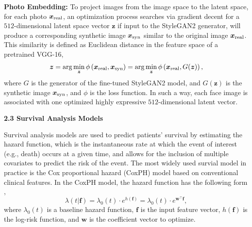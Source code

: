 \documentclass[runningheads]{llncs}
\newcommand{\xreal}{\boldsymbol{x}\textsubscript{real}}
\newcommand{\xfake}{\boldsymbol{x}\textsubscript{syn}}
\newcommand{\vz}{\boldsymbol{z}}
\newcommand{\vf}{\boldsymbol{f}}
\newcommand{\vw}{\boldsymbol{w}}
\begin{document}

\noindent\textbf{Photo Embedding:} To project images from the image space to
the latent space, for each photo $\xreal$, an optimization process searches via gradient decent for a $512$-dimensional latent space vector $\vz$ if input to the StyleGAN2 generator, will produce a corresponding synthetic image $\xfake$ similar to the original image $\xreal$. This similarity is defined as Euclidean distance in the feature space of a pretrained VGG-16,
\begin{equation}
\vz = \arg \min_{\vz} \phi\left(\xreal, \xfake \right) = \arg \min_{\vz} \phi\left(\xreal, G(\vz) \right) ,
\end{equation}
where $G$ is the generator of the fine-tuned StyleGAN2 model, and $G(\vz)$ is the synthetic image $\xfake$, and $\phi$ is the loss function. 
In such a way, each face image is associated with one optimized highly expressive $512$-dimensional latent vector.

\vspace{5pt}
\noindent\textbf{2.3 Survival Analysis Models}
\vspace{5pt}

Survival analysis models are used to predict patients' survival by estimating the hazard function, which is the instantaneous rate at which the event of interest (e.g., death) occurs at a given time, and allows for the inclusion of multiple covariates to predict the risk of the event. 
The most widely used survial model in practice is the Cox proportional hazard (CoxPH) \cite{lin2002modeling} model based on conventional clinical features.
In the CoxPH model, the hazard function has the following form \cite{katzman2018deepsurv},
\begin{equation}
\lambda(t|\vf)=\lambda_0(t)\cdot e^{h(\vf)}=\lambda_0(t)\cdot e^{\vw^\top\vf},
\end{equation}
where $\lambda_0(t)$ is a baseline hazard function, $\vf$ is the input feature vector, $h(\vf)$ is the log-risk function, and $\vw$ is the coefficient vector to optimize. 
\end{document}
